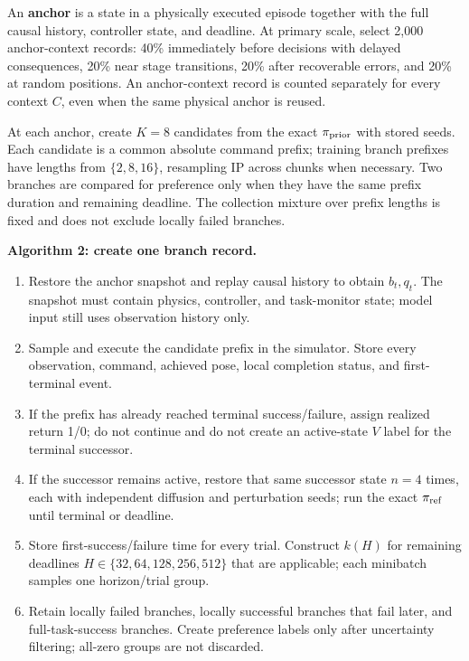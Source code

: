 \documentclass[
  10pt,
]{article}
\providecommand{\tightlist}{%
  \setlength{\itemsep}{0pt}\setlength{\parskip}{0pt}}
\begin{document}
An \textbf{anchor} is a state in a physically executed episode together with the full causal history, controller state, and deadline. At primary scale, select 2,000 anchor-context records: 40\% immediately before decisions with delayed consequences, 20\% near stage transitions, 20\% after recoverable errors, and 20\% at random positions. An anchor-context record is counted separately for every context \(C\), even when the same physical anchor is reused.

At each anchor, create \(K=8\) candidates from the exact \(\pi_{\rm prior}\) with stored seeds. Each candidate is a common absolute command prefix; training branch prefixes have lengths from \(\{2,8,16\}\), resampling IP across chunks when necessary. Two branches are compared for preference only when they have the same prefix duration and remaining deadline. The collection mixture over prefix lengths is fixed and does not exclude locally failed branches.


\textbf{Algorithm 2: create one branch record.}

\begin{enumerate}
\def\labelenumi{\arabic{enumi}.}
\tightlist
\item
  Restore the anchor snapshot and replay causal history to obtain \(b_t,q_t\). The snapshot must contain physics, controller, and task-monitor state; model input still uses observation history only.
\item
  Sample and execute the candidate prefix in the simulator. Store every observation, command, achieved pose, local completion status, and first-terminal event.
\item
  If the prefix has already reached terminal success/failure, assign realized return 1/0; do not continue and do not create an active-state \(V\) label for the terminal successor.
\item
  If the successor remains active, restore that same successor state \(n=4\) times, each with independent diffusion and perturbation seeds; run the exact \(\pi_{\rm ref}\) until terminal or deadline.
\item
  Store first-success/failure time for every trial. Construct \(k(H)\) for remaining deadlines \(H\in\{32,64,128,256,512\}\) that are applicable; each minibatch samples one horizon/trial group.
\item
  Retain locally failed branches, locally successful branches that fail later, and full-task-success branches. Create preference labels only after uncertainty filtering; all-zero groups are not discarded.
\end{enumerate}
\end{document}
